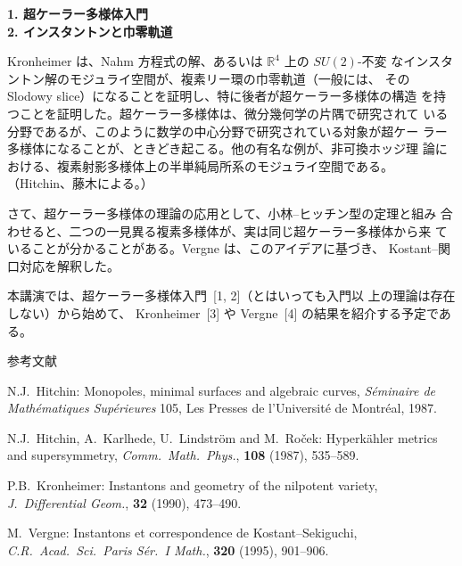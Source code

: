 \documentclass[uplatex,dvipdfmx]{jlreq}
\begin{document}
\newpage

\begin{center}
{\large\bfseries 1. 超ケーラー多様体入門\\
2. インスタントンと巾零軌道}\\[6pt]
\hspace*{\fill}{\large\bfseries 中島 啓（京都大学 大学院理学研究科）}
\end{center}

Kronheimer は、Nahm 方程式の解、あるいは
${\mathbb R}^4$ 上の $SU(2)$-不変
なインスタントン解のモジュライ空間が、複素リー環の巾零軌道（一般には、
その Slodowy slice）になることを証明し、特に後者が超ケーラー多様体の構造
を持つことを証明した。超ケーラー多様体は、微分幾何学の片隅で研究されて
いる分野であるが、このように数学の中心分野で研究されている対象が超ケー
ラー多様体になることが、ときどき起こる。他の有名な例が、非可換ホッジ理
論における、複素射影多様体上の半単純局所系のモジュライ空間である。
（Hitchin、藤木による。）

さて、超ケーラー多様体の理論の応用として、小林--ヒッチン型の定理と組み
合わせると、二つの一見異る複素多様体が、実は同じ超ケーラー多様体から来
ていることが分かることがある。Vergne は、このアイデアに基づき、
Kostant--関口対応を解釈した。

本講演では、超ケーラー多様体入門~[1, 2]（とはいっても入門以
上の理論は存在しない）から始めて、
Kronheimer~[3] や Vergne~[4]
の結果を紹介する予定である。

\begin{center}\textsc{参考文献}\end{center}
\begin{enumerate}[{[1]}]
  \item N.J.~Hitchin:
    Monopoles, minimal surfaces and algebraic curves,
    \textit{S\'eminaire de Math\'ematiques Sup\'erieures} 105,
    Les Presses de l'Universit\'e de Montr\'eal, 1987.
  \item N.J.~Hitchin, A.~Karlhede, U.~Lindstr\"om and M.~Ro\v{c}ek:
    Hyperk\"ahler metrics and supersymmetry,
    \textit{Comm.\ Math.\ Phys.}, \textbf{108} (1987), 535--589.
  \item P.B.~Kronheimer:
    Instantons and geometry of the nilpotent variety,
    \textit{J.\ Differential Geom.}, \textbf{32} (1990), 473--490.
  \item M.~Vergne:
    Instantons et correspondence de Kostant--Sekiguchi,
    \textit{C.R.\ Acad.\ Sci.\ Paris S\'er.\ I Math.}, \textbf{320} (1995), 901--906.
\end{enumerate}
\end{document}

